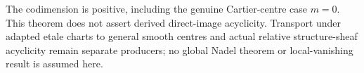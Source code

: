 \begin{remark}
The codimension is positive, including the genuine Cartier-centre case
$m=0$. This theorem does not assert derived direct-image acyclicity.
Transport under adapted etale charts to general smooth centres and actual
relative structure-sheaf acyclicity remain separate producers; no global
Nadel theorem or local-vanishing result is assumed here.
\end{remark}
